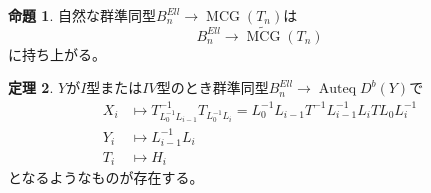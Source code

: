 \documentclass[uplatex, a4paper, dvipdfmx]{jsarticle}
\theoremstyle{definition}
\newtheorem{theorem}{定理}[section]
\newtheorem{proposition}[theorem]{命題}
\DeclareMathOperator{\Auteq}{\mathrm{Auteq}}
\DeclareMathOperator{\MCG}{\mathrm{MCG}}
\begin{document}
\begin{proposition}
    自然な群準同型$B^{Ell}_n \to \MCG(T_n)$は
    \begin{equation}
        B^{Ell}_n \to \widetilde{\MCG}(T_n)
    \end{equation}
    に持ち上がる。
\end{proposition}
\begin{theorem}
    $Y$が$I$型または$IV$型のとき群準同型$B^{Ell}_n \to \Auteq D^b(Y)$で
    \begin{align}
        X_i & \mapsto T_{L_0^{-1}L_{i-1}}^{-1}T_{L_0^{-1}L_i} = L_0^{-1}L_{i-1}T^{-1}L_{i-1}^{-1}L_iTL_0L_i^{-1} \\
        Y_i & \mapsto L_{i-1}^{-1}L_i                                                                            \\
        T_i & \mapsto H_i
    \end{align}
    となるようなものが存在する。
\end{theorem}
\end{document}
